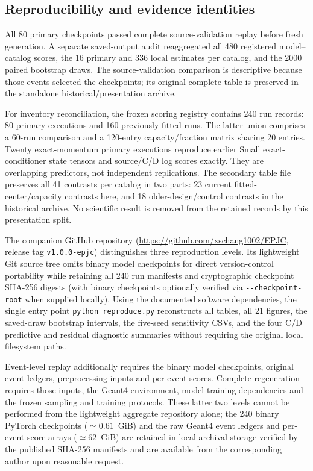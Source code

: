 \documentclass[smallextended,epjc3]{svjour3}
\begin{document}


\subsection{Reproducibility and evidence identities}
All 80 primary checkpoints passed complete source-validation replay before
fresh generation. A separate saved-output audit reaggregated all 480 registered
model--catalog scores, the 16 primary and 336 local estimates per catalog,
and the 2000 paired bootstrap draws. The source-validation comparison is
descriptive because those events selected the checkpoints; its original
complete table is preserved in the standalone historical/presentation archive.

For inventory reconciliation, the frozen scoring registry contains 240 run
records: 80 primary executions and 160 previously fitted runs. The latter
union comprises a 60-run comparison and a 120-entry capacity/fraction matrix
sharing 20 entries. Twenty exact-momentum primary executions reproduce
earlier Small exact-conditioner state tensors and source/C/D log scores
exactly. They are overlapping predictors, not independent replications.
The secondary table file preserves all 41 contrasts per catalog in two parts:
23 current fitted-center/capacity contrasts here, and 18 older-design/control
contrasts in the historical archive. No scientific result is removed from
the retained records by this presentation split.

The companion GitHub repository (\url{https://github.com/xschang1002/EPJC},
release tag \texttt{v1.0.0-epjc}) distinguishes three reproduction levels.
Its lightweight Git source tree omits binary model checkpoints for direct
version-control portability while retaining all 240 run manifests and
cryptographic checkpoint SHA-256 digests (with binary checkpoints optionally
verified via \texttt{-{}-checkpoint-root} when supplied locally).
Using the documented software dependencies, the single entry point
\texttt{python reproduce.py} reconstructs all tables, all 21 figures, the
saved-draw bootstrap intervals, the five-seed sensitivity CSVs, and the four
C/D predictive and residual diagnostic summaries without requiring the original
local filesystem paths.

Event-level replay additionally requires the binary model checkpoints,
original event ledgers, preprocessing inputs and per-event scores. Complete
regeneration requires those inputs, the Geant4 environment, model-training
dependencies and the frozen sampling and training protocols. These latter two
levels cannot be performed from the lightweight aggregate repository alone;
the 240 binary PyTorch checkpoints ($\simeq 0.61$~GiB) and the raw Geant4
event ledgers and per-event score arrays ($\simeq 62$~GiB) are retained in
local archival storage verified by the published SHA-256 manifests and are
available from the corresponding author upon reasonable request.
\end{document}

